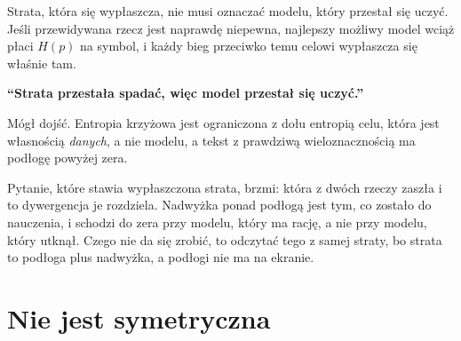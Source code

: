 \begin{fr}

Strata, która się wypłaszcza, nie musi oznaczać modelu, który przestał się
uczyć. Jeśli przewidywana rzecz jest naprawdę niepewna, najlepszy możliwy
model wciąż płaci $H(p)$ na symbol, i każdy bieg przeciwko temu celowi
wypłaszcza się właśnie tam.

\begin{trapbox}
\textbf{\enquote{Strata przestała spadać, więc model przestał się uczyć.}}

Mógł dojść. Entropia krzyżowa jest ograniczona z dołu entropią celu, która
jest własnością \emph{danych}, a nie modelu, a tekst z prawdziwą
wieloznacznością ma podłogę powyżej zera.

Pytanie, które stawia wypłaszczona strata, brzmi: która z dwóch rzeczy
zaszła \dash{} i to dywergencja je rozdziela. Nadwyżka ponad podłogą jest
tym, co zostało do nauczenia, i schodzi do zera przy modelu, który ma rację,
a nie przy modelu, który utknął. Czego nie da się zrobić, to odczytać tego z
samej straty, bo strata to podłoga plus nadwyżka, a podłogi nie ma na
ekranie.
\end{trapbox}
\end{fr}

\section{Nie jest symetryczna}
\label{sec:P30-asymmetry}

